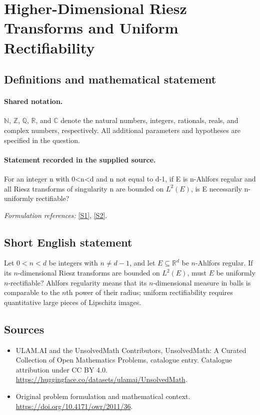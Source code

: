 \documentclass[11pt]{article}
\newcommand{\sref}[2]{\hyperlink{source:#1:#2}{[S#2]}}
\begin{document}
\section{Higher-Dimensional Riesz Transforms and Uniform Rectifiability}\label{statement}

\subsection{Definitions and mathematical statement}

\paragraph{Shared notation.}$\mathbb N$, $\mathbb Z$, $\mathbb Q$, $\mathbb R$, and $\mathbb C$ denote the natural numbers, integers, rationals, reals, and complex numbers, respectively. All additional parameters and hypotheses are specified in the question.


\paragraph{Statement recorded in the supplied source.}
For an integer n with 0<n<d and n not equal to d-1, if E is n-Ahlfors regular and all Riesz transforms of singularity n are bounded on $L^2(E)$, is E necessarily n-uniformly rectifiable?
\par\smallskip\textit{Formulation references:} \sref{statement}{1}, \sref{statement}{2}.
\subsection{Short English statement}
Let $0<n<d$ be integers with $n\neq d-1$, and let $E\subseteq\mathbb R^d$ be $n$-Ahlfors regular. If its $n$-dimensional Riesz transforms are bounded on $L^2(E)$, must $E$ be uniformly $n$-rectifiable? Ahlfors regularity means that its $n$-dimensional measure in balls is comparable to the $n$th power of their radius; uniform rectifiability requires quantitative large pieces of Lipschitz images.
\subsection{Sources}
\begin{itemize}
\item[\hypertarget{source:statement:1}{S1}] ULAM.AI and the UnsolvedMath Contributors, UnsolvedMath: A Curated Collection of Open Mathematics Problems, catalogue entry. Catalogue attribution under CC BY 4.0.
\url{https://huggingface.co/datasets/ulamai/UnsolvedMath}.
\item[\hypertarget{source:statement:2}{S2}] Original problem formulation and mathematical context.
\url{https://doi.org/10.4171/owr/2011/36}.
\end{itemize}
\label{end:statement}
\end{document}
